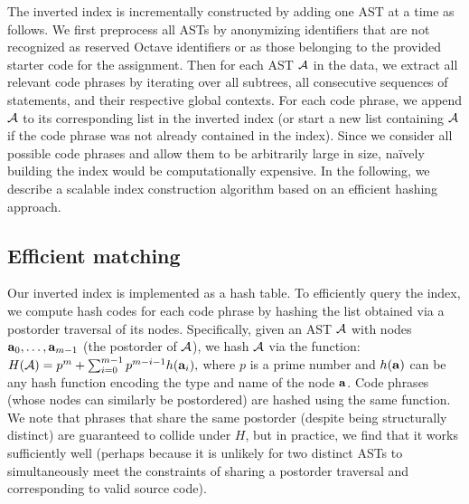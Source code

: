  The inverted index is incrementally constructed by adding one AST at a time as follows.
We first preprocess all ASTs by anonymizing identifiers that are not recognized as reserved Octave 
identifiers or as those belonging to the provided starter code for the assignment.
Then for each AST $\mathcal{A}$ in the data,
we extract all relevant code phrases by iterating over all subtrees, all consecutive sequences of statements, 
and their respective global contexts. For each code phrase, we append $\mathcal{A}$ to its corresponding list in the inverted
index (or start a new list containing $\mathcal{A}$ if the code phrase was not already contained in the index).	
Since we consider all possible code phrases and allow them to be arbitrarily large in size,
na\"{i}vely building the index would be computationally expensive.  In the following, we describe a scalable index
construction algorithm based on an efficient hashing approach.



\subsection{Efficient matching}
Our inverted index is implemented as a hash table.  To efficiently query the index, we compute
hash codes for each code phrase by hashing the list obtained via a postorder traversal of its nodes.
Specifically, given an AST $\mathcal{A}$ with nodes ${\bf a}_{0},\dots,{\bf a}_{m-1}$ (the postorder of $\mathcal{A}$),
we hash $\mathcal{A}$ via the function:
$
H(\mathcal{A}) =  p^m + \sum_{i=0}^{m-1} p^{m-i-1} h({\bf a}_{i}), 
$
where $p$ is a prime number and $h({\bf a})$ can be any hash function encoding the type and name of the node ${\bf a}$.
Code phrases (whose nodes can similarly be postordered) are hashed using the same function.
We note that phrases that share the same postorder (despite being structurally distinct) are guaranteed to collide under $H$, but 
in practice, we find that it works sufficiently well (perhaps because it is unlikely for two distinct ASTs to simultaneously meet
the constraints of sharing a postorder traversal and corresponding to valid source code).



